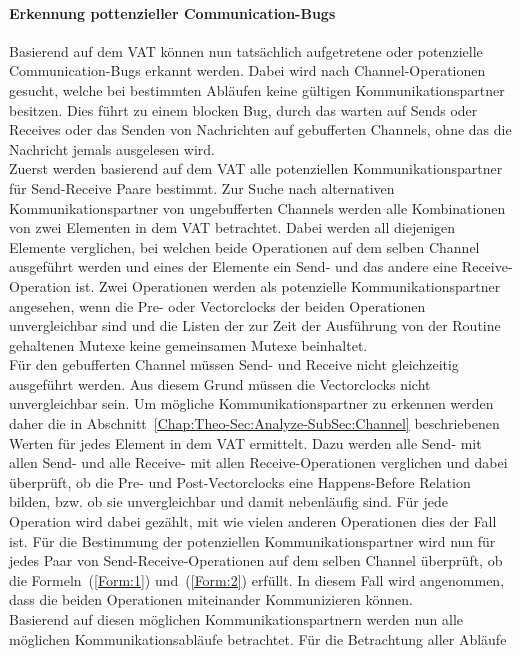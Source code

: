 \paragraph{Erkennung pottenzieller Communication-Bugs}
Basierend auf dem VAT können nun tatsächlich aufgetretene oder potenzielle 
Communication-Bugs erkannt werden. Dabei wird nach Channel-Operationen 
gesucht, welche bei bestimmten Abläufen keine gültigen Kommunikationspartner
besitzen. Dies führt zu einem blocken Bug, durch das warten auf 
Sends oder Receives oder das Senden von Nachrichten auf gebufferten 
Channels, ohne das die Nachricht jemals ausgelesen wird.\\  
Zuerst werden basierend auf dem VAT alle potenziellen Kommunikationspartner 
für Send-Receive Paare bestimmt.
Zur Suche nach alternativen Kommunikationspartner von ungebufferten Channels
werden alle Kombinationen
von zwei Elementen in dem VAT betrachtet. Dabei werden all diejenigen 
Elemente verglichen, bei welchen beide Operationen auf dem selben Channel 
ausgeführt werden und eines der 
Elemente ein Send- und das andere eine Receive-Operation ist. Zwei Operationen
werden als potenzielle Kommunikationspartner angesehen, wenn die Pre- oder
Vectorclocks der beiden 
Operationen unvergleichbar sind und die Listen der zur Zeit der 
Ausführung von der Routine gehaltenen Mutexe keine gemeinsamen Mutexe beinhaltet.\\
Für den gebufferten Channel müssen Send- und Receive nicht 
gleichzeitig ausgeführt werden. Aus diesem Grund müssen die Vectorclocks 
nicht unvergleichbar sein. Um mögliche Kommunikationspartner zu erkennen 
werden daher 
die in Abschnitt~\ref{Chap:Theo-Sec:Analyze-SubSec:Channel} beschriebenen 
Werten für jedes Element in dem VAT ermittelt. Dazu werden alle Send- mit allen 
Send- und alle Receive- mit allen Receive-Operationen verglichen 
und dabei überprüft, ob die Pre- und Post-Vectorclocks eine Happens-Before 
Relation bilden, bzw. ob sie unvergleichbar und damit nebenläufig sind. 
Für jede Operation wird dabei gezählt, mit wie vielen anderen Operationen 
dies der Fall ist.
Für die Bestimmung der potenziellen Kommunikationspartner wird nun 
für jedes Paar von Send-Receive-Operationen auf dem selben Channel 
überprüft, 
ob die Formeln~(\eqref{Form:1}) und~(\eqref{Form:2}) 
erfüllt. In diesem Fall wird angenommen, dass die beiden Operationen
miteinander Kommunizieren können.\\
Basierend auf diesen möglichen Kommunikationspartnern werden nun alle möglichen
Kommunikationsabläufe betrachtet. Für die Betrachtung aller Abläufe 
